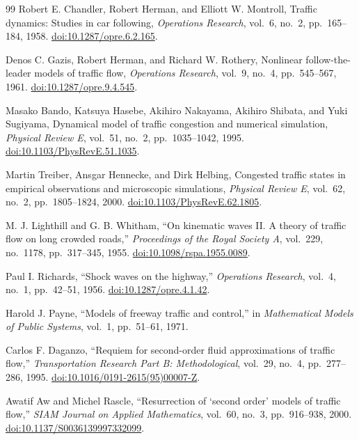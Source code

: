 \documentclass[11pt,a4paper,openany]{book}
\numberwithin{equation}{chapter}
\numberwithin{figure}{chapter}
\numberwithin{table}{chapter}
\begin{document}
\clearpage
\begin{thebibliography}{99}
Robert E. Chandler, Robert Herman, and Elliott W. Montroll,
{Traffic dynamics: Studies in car following},
\emph{Operations Research}, vol.~6, no.~2, pp.~165--184, 1958.
\href{https://doi.org/10.1287/opre.6.2.165}{doi:10.1287/opre.6.2.165}.

Denos C. Gazis, Robert Herman, and Richard W. Rothery,
{Nonlinear follow-the-leader models of traffic flow},
\emph{Operations Research}, vol.~9, no.~4, pp.~545--567, 1961.
\href{https://doi.org/10.1287/opre.9.4.545}{doi:10.1287/opre.9.4.545}.

Masako Bando, Katsuya Hasebe, Akihiro Nakayama, Akihiro Shibata, and Yuki Sugiyama,
{Dynamical model of traffic congestion and numerical simulation},
\emph{Physical Review E}, vol.~51, no.~2, pp.~1035--1042, 1995.
\href{https://doi.org/10.1103/PhysRevE.51.1035}{doi:10.1103/PhysRevE.51.1035}.

Martin Treiber, Ansgar Hennecke, and Dirk Helbing,
{Congested traffic states in empirical observations and microscopic simulations},
\emph{Physical Review E}, vol.~62, no.~2, pp.~1805--1824, 2000.
\href{https://doi.org/10.1103/PhysRevE.62.1805}{doi:10.1103/PhysRevE.62.1805}.

M. J. Lighthill and G. B. Whitham,
``On kinematic waves II. A theory of traffic flow on long crowded roads,''
\emph{Proceedings of the Royal Society A}, vol.~229, no.~1178, pp.~317--345, 1955.
\href{https://doi.org/10.1098/rspa.1955.0089}{doi:10.1098/rspa.1955.0089}.

Paul I. Richards,
``Shock waves on the highway,''
\emph{Operations Research}, vol.~4, no.~1, pp.~42--51, 1956.
\href{https://doi.org/10.1287/opre.4.1.42}{doi:10.1287/opre.4.1.42}.

Harold J. Payne,
``Models of freeway traffic and control,''
in \emph{Mathematical Models of Public Systems}, vol.~1, pp.~51--61, 1971.

Carlos F. Daganzo,
``Requiem for second-order fluid approximations of traffic flow,''
\emph{Transportation Research Part B: Methodological}, vol.~29, no.~4, pp.~277--286, 1995.
\href{https://doi.org/10.1016/0191-2615(95)00007-Z}{doi:10.1016/0191-2615(95)00007-Z}.

Awatif Aw and Michel Rascle,
``Resurrection of `second order' models of traffic flow,''
\emph{SIAM Journal on Applied Mathematics}, vol.~60, no.~3, pp.~916--938, 2000.
\href{https://doi.org/10.1137/S0036139997332099}{doi:10.1137/S0036139997332099}.


\end{thebibliography}
\end{document}
